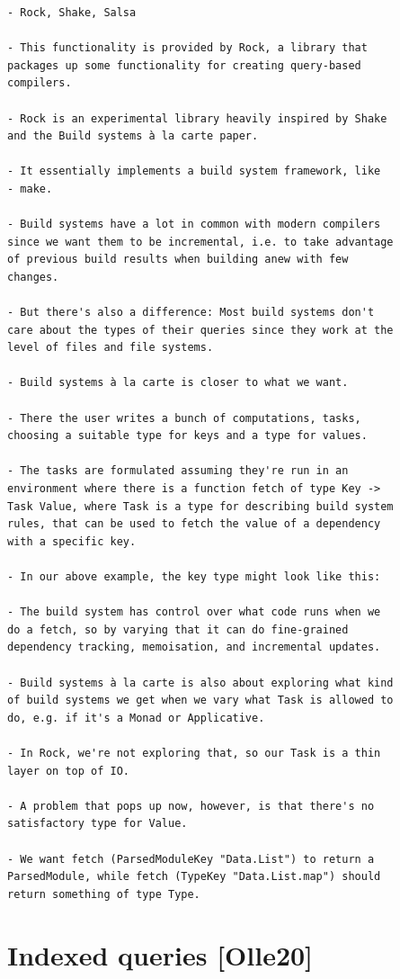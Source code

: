 \documentclass[12pt, a4paper]{report}
\begin{document}
\begin{verbatim}
- Rock, Shake, Salsa

- This functionality is provided by Rock, a library that
packages up some functionality for creating query-based
compilers.

- Rock is an experimental library heavily inspired by Shake
and the Build systems à la carte paper.

- It essentially implements a build system framework, like
- make.

- Build systems have a lot in common with modern compilers
since we want them to be incremental, i.e. to take advantage
of previous build results when building anew with few
changes.

- But there's also a difference: Most build systems don't
care about the types of their queries since they work at the
level of files and file systems.

- Build systems à la carte is closer to what we want.

- There the user writes a bunch of computations, tasks,
choosing a suitable type for keys and a type for values.

- The tasks are formulated assuming they're run in an
environment where there is a function fetch of type Key ->
Task Value, where Task is a type for describing build system
rules, that can be used to fetch the value of a dependency
with a specific key.

- In our above example, the key type might look like this:

- The build system has control over what code runs when we
do a fetch, so by varying that it can do fine-grained
dependency tracking, memoisation, and incremental updates.

- Build systems à la carte is also about exploring what kind
of build systems we get when we vary what Task is allowed to
do, e.g. if it's a Monad or Applicative.

- In Rock, we're not exploring that, so our Task is a thin
layer on top of IO.

- A problem that pops up now, however, is that there's no
satisfactory type for Value.

- We want fetch (ParsedModuleKey "Data.List") to return a
ParsedModule, while fetch (TypeKey "Data.List.map") should
return something of type Type.
\end{verbatim}
\cite{olle_query_based}

\section*{Indexed queries [Olle20]}
\end{document}

